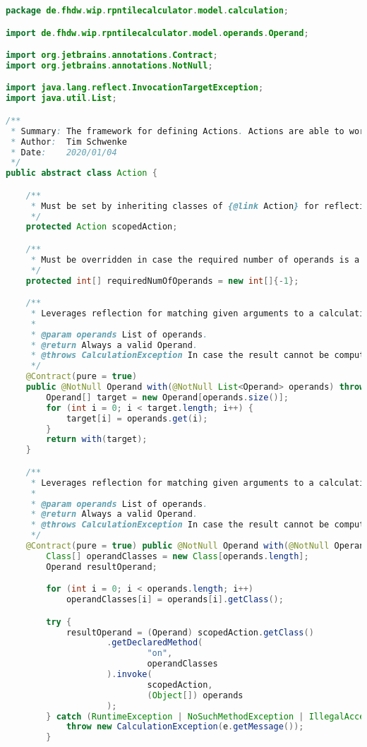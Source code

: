 \begin{lstlisting}[caption=DoubleComparator (Schwenke),label=list:DoubleComparator,language=Java]
package de.fhdw.wip.rpntilecalculator.model.calculation;

import de.fhdw.wip.rpntilecalculator.model.operands.Operand;

import org.jetbrains.annotations.Contract;
import org.jetbrains.annotations.NotNull;

import java.lang.reflect.InvocationTargetException;
import java.util.List;

/**
 * Summary: The framework for defining Actions. Actions are able to work with operands from the stack or executor functions.
 * Author:  Tim Schwenke
 * Date:    2020/01/04
 */
public abstract class Action {

    /**
     * Must be set by inheriting classes of {@link Action} for reflection to work.
     */
    protected Action scopedAction;

    /**
     * Must be overridden in case the required number of operands is a fixed amount.
     */
    protected int[] requiredNumOfOperands = new int[]{-1};

    /**
     * Leverages reflection for matching given arguments to a calculation method.
     *
     * @param operands List of operands.
     * @return Always a valid Operand.
     * @throws CalculationException In case the result cannot be computed.
     */
    @Contract(pure = true)
    public @NotNull Operand with(@NotNull List<Operand> operands) throws CalculationException {
        Operand[] target = new Operand[operands.size()];
        for (int i = 0; i < target.length; i++) {
            target[i] = operands.get(i);
        }
        return with(target);
    }

    /**
     * Leverages reflection for matching given arguments to a calculation method.
     *
     * @param operands List of operands.
     * @return Always a valid Operand.
     * @throws CalculationException In case the result cannot be computed.
     */
    @Contract(pure = true) public @NotNull Operand with(@NotNull Operand... operands) throws CalculationException {
        Class[] operandClasses = new Class[operands.length];
        Operand resultOperand;

        for (int i = 0; i < operands.length; i++)
            operandClasses[i] = operands[i].getClass();

        try {
            resultOperand = (Operand) scopedAction.getClass()
                    .getDeclaredMethod(
                            "on",
                            operandClasses
                    ).invoke(
                            scopedAction,
                            (Object[]) operands
                    );
        } catch (RuntimeException | NoSuchMethodException | IllegalAccessException | InvocationTargetException e) {
            throw new CalculationException(e.getMessage());
        }


\end{lstlisting}
